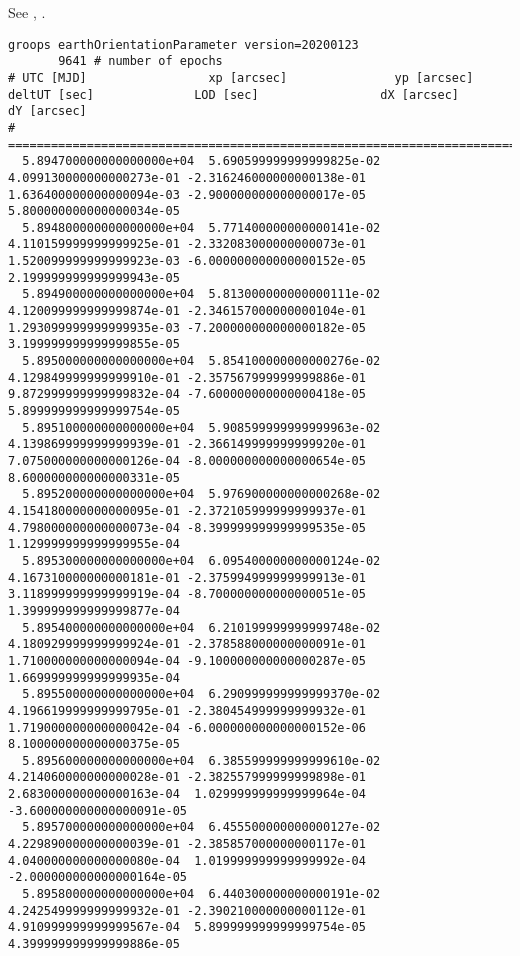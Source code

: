 See , .

\begin{verbatim}
groops earthOrientationParameter version=20200123
       9641 # number of epochs
# UTC [MJD]                 xp [arcsec]               yp [arcsec]               deltUT [sec]              LOD [sec]                 dX [arcsec]               dY [arcsec]
# ====================================================================================================================================================================================
  5.894700000000000000e+04  5.690599999999999825e-02  4.099130000000000273e-01 -2.316246000000000138e-01  1.636400000000000094e-03 -2.900000000000000017e-05  5.800000000000000034e-05
  5.894800000000000000e+04  5.771400000000000141e-02  4.110159999999999925e-01 -2.332083000000000073e-01  1.520099999999999923e-03 -6.000000000000000152e-05  2.199999999999999943e-05
  5.894900000000000000e+04  5.813000000000000111e-02  4.120099999999999874e-01 -2.346157000000000104e-01  1.293099999999999935e-03 -7.200000000000000182e-05  3.199999999999999855e-05
  5.895000000000000000e+04  5.854100000000000276e-02  4.129849999999999910e-01 -2.357567999999999886e-01  9.872999999999999832e-04 -7.600000000000000418e-05  5.899999999999999754e-05
  5.895100000000000000e+04  5.908599999999999963e-02  4.139869999999999939e-01 -2.366149999999999920e-01  7.075000000000000126e-04 -8.000000000000000654e-05  8.600000000000000331e-05
  5.895200000000000000e+04  5.976900000000000268e-02  4.154180000000000095e-01 -2.372105999999999937e-01  4.798000000000000073e-04 -8.399999999999999535e-05  1.129999999999999955e-04
  5.895300000000000000e+04  6.095400000000000124e-02  4.167310000000000181e-01 -2.375994999999999913e-01  3.118999999999999919e-04 -8.700000000000000051e-05  1.399999999999999877e-04
  5.895400000000000000e+04  6.210199999999999748e-02  4.180929999999999924e-01 -2.378588000000000091e-01  1.710000000000000094e-04 -9.100000000000000287e-05  1.669999999999999935e-04
  5.895500000000000000e+04  6.290999999999999370e-02  4.196619999999999795e-01 -2.380454999999999932e-01  1.719000000000000042e-04 -6.000000000000000152e-06  8.100000000000000375e-05
  5.895600000000000000e+04  6.385599999999999610e-02  4.214060000000000028e-01 -2.382557999999999898e-01  2.683000000000000163e-04  1.029999999999999964e-04 -3.600000000000000091e-05
  5.895700000000000000e+04  6.455500000000000127e-02  4.229890000000000039e-01 -2.385857000000000117e-01  4.040000000000000080e-04  1.019999999999999992e-04 -2.000000000000000164e-05
  5.895800000000000000e+04  6.440300000000000191e-02  4.242549999999999932e-01 -2.390210000000000112e-01  4.910999999999999567e-04  5.899999999999999754e-05  4.399999999999999886e-05
\end{verbatim}


